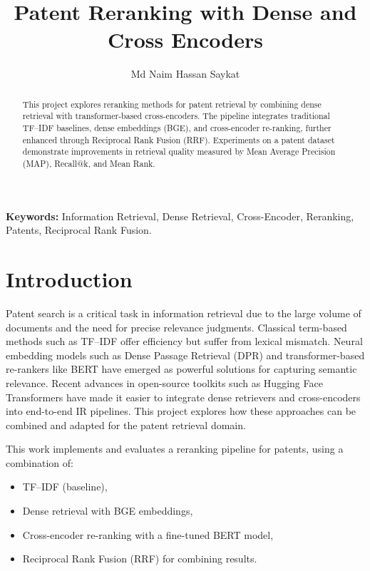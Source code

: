 \documentclass[11pt,a4paper]{article}
\title{\textbf{Patent Reranking with Dense and Cross Encoders}}
\author{Md Naim Hassan Saykat}
\date{}
\begin{document}
\maketitle

\begin{abstract}
This project explores reranking methods for patent retrieval by combining dense retrieval with transformer-based cross-encoders. The pipeline integrates traditional TF--IDF baselines, dense embeddings (BGE), and cross-encoder re-ranking, further enhanced through Reciprocal Rank Fusion (RRF). Experiments on a patent dataset demonstrate improvements in retrieval quality measured by Mean Average Precision (MAP), Recall@k, and Mean Rank.
\end{abstract}

\noindent \textbf{Keywords:} Information Retrieval, Dense Retrieval, Cross-Encoder, Reranking, Patents, Reciprocal Rank Fusion.

\section{Introduction}
Patent search is a critical task in information retrieval due to the large volume of documents and the need for precise relevance judgments. 
Classical term-based methods such as TF--IDF offer efficiency but suffer from lexical mismatch. 
Neural embedding models such as Dense Passage Retrieval (DPR) \cite{karpukhin-etal-2020-dense} and transformer-based re-rankers like BERT \cite{nogueira2019passage} have emerged as powerful solutions for capturing semantic relevance. 
Recent advances in open-source toolkits such as Hugging Face Transformers \cite{wolf2020transformers} have made it easier to integrate dense retrievers and cross-encoders into end-to-end IR pipelines. 
This project explores how these approaches can be combined and adapted for the patent retrieval domain.

This work implements and evaluates a reranking pipeline for patents, using a combination of:
\begin{itemize}
    \item TF--IDF (baseline),
    \item Dense retrieval with BGE embeddings,
    \item Cross-encoder re-ranking with a fine-tuned BERT model,
    \item Reciprocal Rank Fusion (RRF) for combining results.
\end{itemize}
\end{document}
